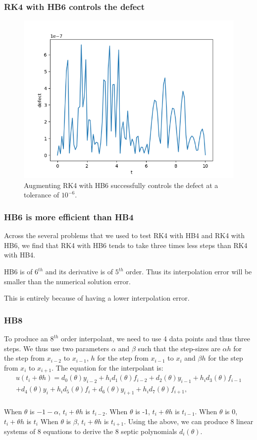 \documentclass{beamer}
\begin{document}
\begin{frame}
\frametitle{RK4 with HB6 controls the defect}
\begin{figure}[H]
    \centering
    \includegraphics[width=0.7\linewidth]{./figures/rk4_with_hb6_p1_global_defect}
    \caption{Augmenting RK4 with HB6 successfully controls the defect at a tolerance of $10^{-6}$.}
    \label{fig:rk4_with_hb6_p1_global_defect}
\end{figure}
\end{frame}

\begin{frame}
\frametitle{HB6 is more efficient than HB4}
Across the several problems that we used to test RK4 with HB4 and RK4 with HB6, we find that RK4 with HB6 tends to take three times less steps than RK4 with HB4. 

HB6 is of $6^{th}$ and its derivative is of $5^{th}$ order. Thus its interpolation error will be smaller than the numerical solution error.

This is entirely because of having a lower interpolation error.
\end{frame}

\begin{frame}
\frametitle{HB8}
To produce an $8^{th}$ order interpolant, we need to use 4 data points and thus three steps. We thus use two parameters $\alpha$ and $\beta$ such that the step-sizes are $\alpha h$ for the step from $x_{i-2}$ to $x_{i - 1}$, $h$ for the step from $x_{i-1}$ to $x_i$ and $\beta h$ for the step from $x_i$ to $x_{i + 1}$.
The equation for the interpolant is:
\begin{equation}
\begin{split}
u(t_i + \theta h) = d_{0}(\theta)y_{i-2} +  h_id_{1}(\theta)f_{i-2} 
+ d_{2}(\theta)y_{i-1}     +  h_id_{3}(\theta)f_{i-1} \\
+ d_{4}(\theta)y_i     +  h_id_{5}(\theta)f_i 
+ d_{6}(\theta)y_{i + 1} + h_id_{7}(\theta)f_{i + 1}, \\
\end{split}
\end{equation}

When $\theta$ is $-1-\alpha$, $t_i + \theta h$ is $t_{i-2}$.
When $\theta$ is -1, $t_i + \theta h$ is $t_{i-1}$.
When $\theta$ is 0, $t_i + \theta h$ is $t_{i}$
When $\theta$ is $\beta$, $t_i + \theta h$ is $t_{i + 1}$. 
Using the above, we can produce 8 linear systems of 8 equations to derive the 8 septic polynomials $d_i(\theta)$.
\end{frame}
\end{document}
